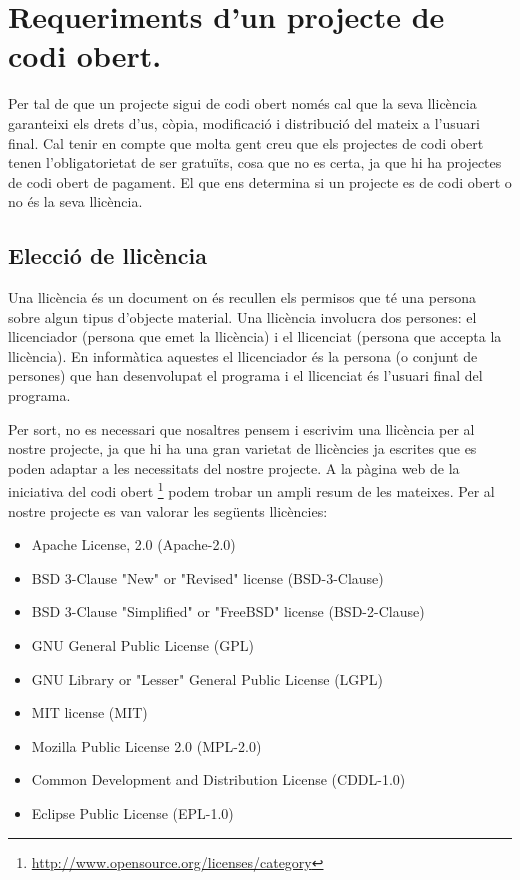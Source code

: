 \section{Requeriments d'un projecte de codi obert.}

Per tal de que un projecte sigui de codi obert només cal que la seva llicència garanteixi els drets  d'us, còpia,  modificació i distribució del mateix a l'usuari final. Cal tenir en compte que molta gent creu que els projectes de codi obert tenen l'obligatorietat de ser gratuïts, cosa que no es certa, ja que hi ha projectes de codi obert de pagament. El que ens determina si un projecte es de codi obert o no és la seva llicència. 

\subsection{Elecció de llicència}

Una llicència és un document on és recullen els permisos que té una persona sobre algun tipus d'objecte material. Una llicència involucra dos persones: el llicenciador (persona que emet la llicència) i el llicenciat (persona que accepta la llicència). En informàtica aquestes el llicenciador és la persona (o conjunt de persones) que han desenvolupat el programa i el llicenciat és l'usuari final del programa. 

Per sort, no es necessari que nosaltres pensem i escrivim una llicència per al nostre projecte, ja que hi ha una gran varietat de llicències ja escrites que es poden adaptar a les necessitats del nostre projecte. A la pàgina web de la iniciativa del codi obert \footnote{\url{http://www.opensource.org/licenses/category}} podem trobar un ampli resum de les mateixes. Per al nostre projecte es van valorar les següents llicències: 

\begin{itemize}
\item{Apache License, 2.0 (Apache-2.0)}
\item{BSD 3-Clause "New" or "Revised" license (BSD-3-Clause)}
\item{BSD 3-Clause "Simplified" or "FreeBSD" license (BSD-2-Clause)}
\item{GNU General Public License (GPL)}
\item{GNU Library or "Lesser" General Public License (LGPL)}
\item{MIT license (MIT)}
\item{Mozilla Public License 2.0 (MPL-2.0)}
\item{Common Development and Distribution License (CDDL-1.0)}
\item{Eclipse Public License (EPL-1.0)}
\end{itemize}

